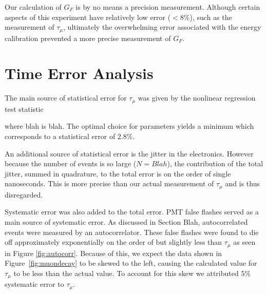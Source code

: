 Our calculation of $G_F$ is by no means a precision measurement.  Although certain aspects of this experiment have relatively low error ($<8\%$), such as the measurement of $\tau_{\mu}$, ultimately the overwhelming error associated with the energy calibration prevented a more precise measurement of $G_F$.


\section{Time Error Analysis}

The main source of statistical error for $\tau_{\mu}$ was given by the nonlinear regression test statistic

where blah is blah.  The optimal choice for parameters yields a minimum which corresponds to a statistical error of $2.8\%$.  

An additional source of statistical error is the jitter in the electronics.  However because the number of events is so large ($N=Blah$), the contribution of the total jitter, summed in quadrature, to the total error is on the order of single nanoseconds.  This is more precise than our actual measurement of $\tau_{\mu}$ and is thus disregarded. 
 
Systematic error was also added to the total error.  PMT false flashes served as a main source of systematic error.  As discussed in Section Blah, autocorrelated events were measured by an autocorrelator. These false flashes were found to die off approximately exponentially on the order of but slightly less than $\tau_{\mu}$ as seen in Figure \ref{fig:autocorr}.  Because of this, we expect the data shown in Figure~\ref{fig:muondecay} to be skewed to the left, causing the calculated value for $\tau_{\mu}$ to be less than the actual value.  To account for this skew we attributed $5\%$ systematic error to $\tau_{\mu}$.

